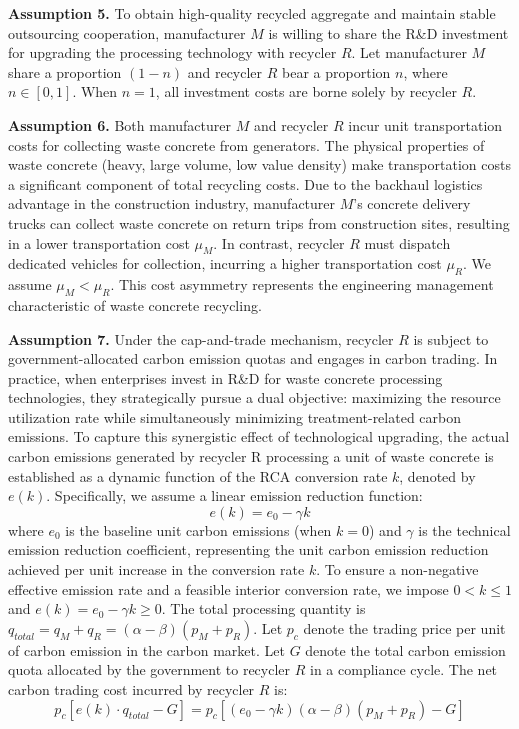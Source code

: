 \documentclass[authoryear,preprint,review,times,10pt]{elsarticle}
\begin{document}
\textbf{Assumption 5.} To obtain high-quality recycled aggregate and maintain stable outsourcing cooperation, manufacturer $M$ is willing to share the R\&D investment for upgrading the processing technology with recycler $R$. Let manufacturer $M$ share a proportion $(1-n)$ and recycler $R$ bear a proportion $n$, where $n \in [0,1]$. When $n=1$, all investment costs are borne solely by recycler $R$.

\textbf{Assumption 6.} Both manufacturer $M$ and recycler $R$ incur unit transportation costs for collecting waste concrete from generators\citep{chileshe2016Analysis}. The physical properties of waste concrete (heavy, large volume, low value density) make transportation costs a significant component of total recycling costs. Due to the backhaul logistics advantage in the construction industry, manufacturer $M$'s concrete delivery trucks can collect waste concrete on return trips from construction sites, resulting in a lower transportation cost $\mu_M$. In contrast, recycler $R$ must dispatch dedicated vehicles for collection, incurring a higher transportation cost $\mu_R$. We assume $\mu_M < \mu_R$. This cost asymmetry represents the engineering management characteristic of waste concrete recycling.

\textbf{Assumption 7.} Under the cap-and-trade mechanism, recycler $R$ is subject to government-allocated carbon emission quotas and engages in carbon trading. In practice, when enterprises invest in R\&D for waste concrete processing technologies, they strategically pursue a dual objective: maximizing the resource utilization rate while simultaneously minimizing treatment-related carbon emissions. To capture this synergistic effect of technological upgrading, the actual carbon emissions generated by recycler R processing a unit of waste concrete is established as a dynamic function of the RCA conversion rate $k$, denoted by $e(k)$. Specifically, we assume a linear emission reduction function:
\begin{equation}
e(k) = e_0 - \gamma k
\end{equation}
where $e_0$ is the baseline unit carbon emissions (when $k = 0$) and $\gamma$ is the technical emission reduction coefficient, representing the unit carbon emission reduction achieved per unit increase in the conversion rate $k$. To ensure a non-negative effective emission rate and a feasible interior conversion rate, we impose $0 < k \leq 1$ and $e(k) = e_0 - \gamma k \geq 0$. The total processing quantity is $q_{total} = q_M + q_R = (\alpha - \beta)(p_M + p_R)$. Let $p_c$ denote the trading price per unit of carbon emission in the carbon market. Let $G$ denote the total carbon emission quota allocated by the government to recycler $R$ in a compliance cycle. The net carbon trading cost incurred by recycler $R$ is:
\begin{equation}
p_c \left[ e(k) \cdot q_{total} - G \right] = p_c \left[ (e_0 - \gamma k)(\alpha - \beta)(p_M + p_R) - G \right]
\end{equation}
\end{document}
